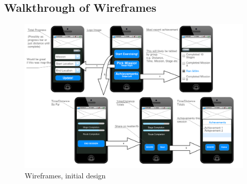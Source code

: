 \subsection{Walkthrough of Wireframes}
\begin{figure}[h]
  \centering
  \includegraphics[width=\linewidth]{images/Wireframes.png}
  \caption{Wireframes, initial design}
  \label{wireframes_1}
\end{figure}

